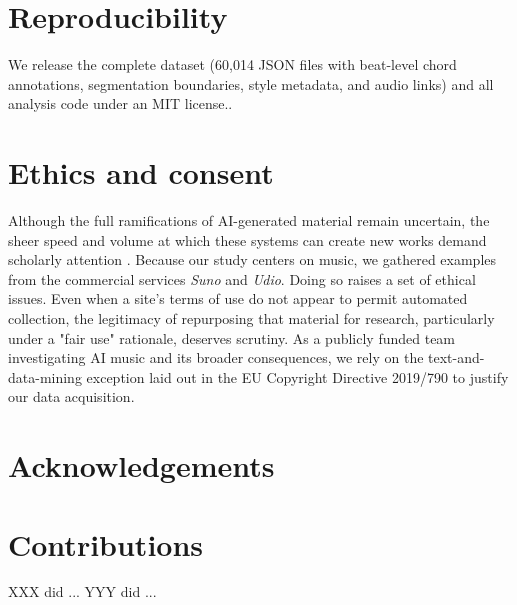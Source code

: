 \documentclass{article}
\begin{document}
\section{Reproducibility}
\label{sec:reproducibility}
We release the complete dataset (60,014 JSON files with beat-level chord annotations, segmentation boundaries, style metadata, and audio links) and all analysis code under an MIT license..

\section{Ethics and consent}

Although the full ramifications of AI-generated material remain uncertain, the sheer speed and volume at which these systems can create new works demand scholarly attention \citep{Sturm2024a,pelly2025mood}. Because our study centers on music, we gathered examples from the commercial services {\em Suno} and {\em Udio}. Doing so raises a set of ethical issues. Even when a site's terms of use do not appear to permit automated collection, the legitimacy of repurposing that material for research, particularly under a "fair use" rationale, deserves scrutiny. As a publicly funded team investigating AI music and its broader consequences, we rely on the text-and-data-mining exception laid out in the EU Copyright Directive 2019/790 \citep{EUDirective2019} to justify our data acquisition.

\section*{Acknowledgements}


\section*{Contributions}
XXX did ... YYY did ... 
\end{document}
